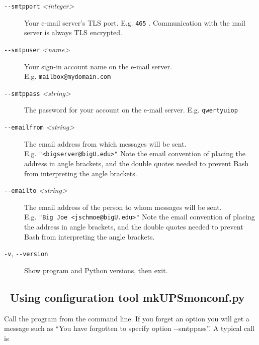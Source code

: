 \documentclass[12pt]{article}
\newlength{\headersep}\setlength{\headersep}{3mm}
\newcommand{\Hsep}{\hspace{\headersep}}
\newcommand{\mkUPSmonconf}{\mbox{\textcolor{UPSMONCOLOUR}{mkUPSmonconf.py}}}
\begin{document}
\begin{description}
\item[\texttt{-\/-smtpport} \textit{<integer>}] \hspace{7mm} Your e-mail
  server's TLS port. E.g. \texttt{465} . Communication with the mail server is
  always TLS encrypted.

\item[\texttt{-\/-smtpuser} \textit{<name>}] \hspace{6mm} Your sign-in account
  name on the e-mail server. \\ E.g.
  \texttt{mailbox@mydomain.{\allowbreak}com}

\item[\texttt{-\/-smtppass} \textit{<string>}] \hspace{7mm} The password for
  your account on the e-mail server. E.g. \texttt{qwertyuiop}

\item[\texttt{-\/-emailfrom} \textit{<string>}] \hspace{7mm} The email address
  from which messages will be sent. \\ E.g.  \texttt{"<bigserver@bigU.edu>"}
  Note the email convention of placing the address in angle brackets, and the
  double quotes needed to prevent Bash from interpreting the angle brackets.

\item[\texttt{-\/-emailto} \textit{<string>}] \hspace{7mm} The email address
  of the person to whom messages will be sent. \\ E.g.  \texttt{"Big Joe
    <jschmoe@bigU.edu>"} Note the email convention of placing the address in
  angle brackets, and the double quotes needed to prevent Bash from
  interpreting the angle brackets.

\item[\texttt{-v}, \texttt{-\/-version}] \hspace{7mm} Show program and Python
  versions, then exit.

\end{description}

\clearpage
\subsection{\Hsep\ Using configuration tool \mkUPSmonconf}\label{section:usemkUPSmonconf}

Call the program from the command line.  If you forget an option you will get
a message such as ``You have forgotten to specify option -\/-smtppass''.  A
typical call is
\end{document}
